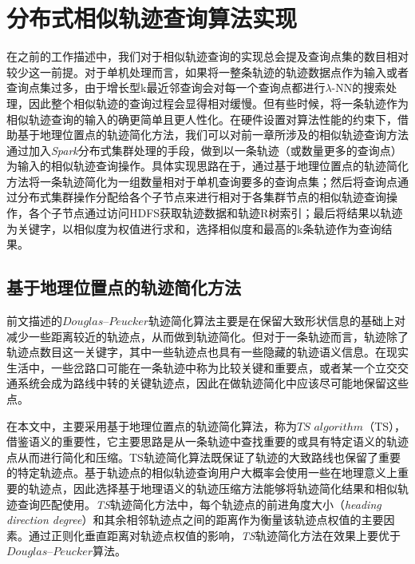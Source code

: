 

\section{分布式相似轨迹查询算法实现}
\label{sec:distributed algo}
在之前的工作描述中，我们对于相似轨迹查询的实现总会提及查询点集的数目相对较少这一前提。对于单机处理而言，如果将一整条轨迹的轨迹数据点作为输入或者查询点集过多，由于增长型k最近邻查询会对每一个查询点都进行$\lambda$-NN的搜索处理，因此整个相似轨迹的查询过程会显得相对缓慢。但有些时候，将一条轨迹作为相似轨迹查询的输入的确更简单且更人性化。在硬件设置对算法性能的约束下，借助基于地理位置点的轨迹简化方法，我们可以对前一章所涉及的相似轨迹查询方法通过加入\emph{Spark}分布式集群处理的手段，做到以一条轨迹（或数量更多的查询点）为输入的相似轨迹查询操作。具体实现思路在于，通过基于地理位置点的轨迹简化方法将一条轨迹简化为一组数量相对于单机查询要多的查询点集；然后将查询点通过分布式集群操作分配给各个子节点来进行相对于各集群节点的相似轨迹查询操作，各个子节点通过访问HDFS获取轨迹数据和轨迹R树索引；最后将结果以轨迹为关键字，以相似度为权值进行求和，选择相似度和最高的k条轨迹作为查询结果。

\subsection{基于地理位置点的轨迹简化方法}
\label{subsec:trajectory simplification based on locations}
前文描述的$Douglas$–$Peucker$轨迹简化算法主要是在保留大致形状信息的基础上对减少一些距离较近的轨迹点，从而做到轨迹简化。但对于一条轨迹而言，轨迹除了轨迹点数目这一关键字，其中一些轨迹点也具有一些隐藏的轨迹语义信息。在现实生活中，一些岔路口可能在一条轨迹中称为比较关键和重要点，或者某一个立交交通系统会成为路线中转的关键轨迹点，因此在做轨迹简化中应该尽可能地保留这些点。

在本文中，主要采用基于地理位置点的轨迹简化算法，称为$TS$ $algorithm$（TS），借鉴语义的重要性，它主要思路是从一条轨迹中查找重要的或具有特定语义的轨迹点从而进行简化和压缩。TS轨迹简化算法既保证了轨迹的大致路线也保留了重要的特定轨迹点。基于轨迹点的相似轨迹查询用户大概率会使用一些在地理意义上重要的轨迹点，因此选择基于地理语义的轨迹压缩方法能够将轨迹简化结果和相似轨迹查询匹配使用。\emph{TS}轨迹简化方法中，每个轨迹点的前进角度大小（\emph{heading direction degree}）和其余相邻轨迹点之间的距离作为衡量该轨迹点权值的主要因素。通过正则化垂直距离对轨迹点权值的影响，\emph{TS}轨迹简化方法在效果上要优于$Douglas$–$Peucker$算法。

